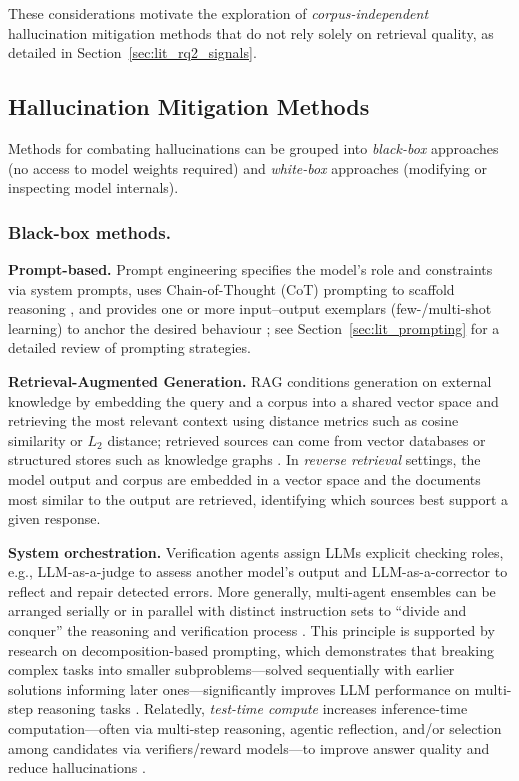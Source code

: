 These considerations motivate the exploration of \textit{corpus-independent} hallucination mitigation methods that do not rely solely on retrieval quality, as detailed in Section~\ref{sec:lit_rq2_signals}.

\subsection{Hallucination Mitigation Methods}

Methods for combating hallucinations can be grouped into \emph{black-box} approaches (no access to model weights required) and \emph{white-box} approaches (modifying or inspecting model internals).

\subsubsection{Black-box methods.}

\noindent\textbf{Prompt-based.} Prompt engineering specifies the model's role and constraints via system prompts, uses Chain-of-Thought (CoT) prompting to scaffold reasoning \citep{wei2022chain}, and provides one or more input--output exemplars (few-/multi-shot learning) to anchor the desired behaviour \citep{brown2020language}; see Section~\ref{sec:lit_prompting} for a detailed review of prompting strategies.

\noindent\textbf{Retrieval-Augmented Generation.} RAG conditions generation on external knowledge by embedding the query and a corpus into a shared vector space and retrieving the most relevant context using distance metrics such as cosine similarity or $L_2$ distance; retrieved sources can come from vector databases or structured stores such as knowledge graphs \citep{lewis2020retrieval}. In \emph{reverse retrieval} settings, the model output and corpus are embedded in a vector space and the documents most similar to the output are retrieved, identifying which sources best support a given response.

\noindent\textbf{System orchestration.} Verification agents assign LLMs explicit checking roles, e.g., LLM-as-a-judge to assess another model's output and LLM-as-a-corrector to reflect and repair detected errors. More generally, multi-agent ensembles can be arranged serially or in parallel with distinct instruction sets to ``divide and conquer'' the reasoning and verification process \citep{shinn2024reflexion}. This principle is supported by research on decomposition-based prompting, which demonstrates that breaking complex tasks into smaller subproblems---solved sequentially with earlier solutions informing later ones---significantly improves LLM performance on multi-step reasoning tasks \citep{zhou2023leasttomostpromptingenablescomplex}. Relatedly, \emph{test-time compute} increases inference-time computation---often via multi-step reasoning, agentic reflection, and/or selection among candidates via verifiers/reward models---to improve answer quality and reduce hallucinations \citep{openai2024reasoning, guo2025deepseek, snell2024scalingllmtesttimecompute}.

